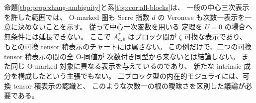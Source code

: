 \begin{remark}\label{tbp:rem:scope}
命題\ref{tbp:prop:zhang-ambiguity}と系\ref{tbp:cor:all-blocks}は、
一般の中心三次表示を許した範囲では、
O-marked 圏も Serre 指数 $d$ の Veronese も次数一表示を一意に決めないことを示す。
従って中心一次変数を用いる
定理を $U=0$ の場合へ無条件には延長できない。
ここで $A_{a,b}^\tau$ はブロック間が $\zeta$ 可換な表示であり、
もとの可換 tensor 積表示のチャートには属さない。
この例だけで、二つの可換 tensor 積表示の間の全 O-同値が
次数付き同型から来ないとは結論しない。
また同じ O-marked 対象に異なる表示を与えているのであり、
新たな intrinsic 成分を構成したという主張でもない。
二ブロック型の内在的モジュライには、可換 tensor 積表示の認識と、
このような次数一の根の曖昧さを区別した議論が必要である。
\end{remark}
